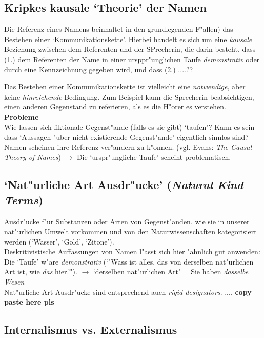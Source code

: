 \documentclass[emulatestandardclasses]{scrartcl}
\begin{document}
\subsection{Kripkes kausale `Theorie' der Namen}

Die Referenz eines Namens beinhaltet in den grundlegenden F"allen) das Bestehen einer `Kommunikationskette'. Hierbei handelt es sich um eine \emph{kausale} Beziehung zwischen dem Referenten und der SPrecherin, die darin besteht, dass (1.) dem Referenten der Name in einer ursppr"unglichen Taufe \emph{demonstrativ} oder durch eine Kennzeichnung gegeben wird, und dass (2.) ....??

Das Bestehen einer Kommunikationskette ist vielleicht eine \emph{notwendige}, aber keine \emph{hinreichende} Bedingung. Zum Beispiel kann die Sprecherin beabsichtigen, einen anderen Gegenstand zu referieren, als es die H"orer es verstehen.\\

\noindent \textbf{Probleme}\\
Wie lassen sich fiktionale Gegenst"ande (falls es sie gibt) `taufen'? Kann es sein dass `Aussagen "uber nicht existierende Gegenst"ande' eigentlich sinnlos sind?\\
Namen scheinen ihre Referenz ver"andern zu k"onnen. (vgl. Evans: \emph{The Causal Theory of Names}) $\rightarrow$ Die `urspr"ungliche Taufe' scheint problematisch.

\subsection{`Nat"urliche Art Ausdr"ucke' (\emph{Natural Kind Terms})}

Ausdr"ucke f"ur Substanzen oder Arten von Gegenst"anden, wie sie in unserer nat"urlichen Umwelt vorkommen und von den Naturwissenschaften kategorisiert werden (`Wasser', `Gold', `Zitone').\\
Deskritivistische Auffassungen von Namen l"asst sich hier "ahnlich gut anwenden: Die `Taufe' w"are \emph{demonstrativ} (`"Wass ist alles, das von derselben nat"urlichen Art ist, wie \emph{das} hier.'"). $\rightarrow$ `derselben nat"urlichen Art' = Sie haben \emph{dasselbe Wesen}\\
Nat"urliche Art Ausdr"ucke sind entsprechend auch \emph{rigid designators}. .... \textbf{copy paste here pls}

\subsection{Internalismus vs. Externalismus}
\end{document}
